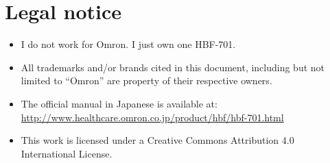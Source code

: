 \documentclass[10pt]{article}
\begin{document}
\section{Legal notice}
\label{sec:legal}
\begin{itemize}
  \item I do not work for Omron. I just own one HBF-701.
  \item All trademarks and/or brands cited in this document, including but not
        limited to ``Omron'' are property of their respective owners.
  \item The official manual in Japanese is available at:
        \url{http://www.healthcare.omron.co.jp/product/hbf/hbf-701.html}
  \item This work is licensed under a Creative Commons Attribution 4.0
        International License.
\end{itemize}
\end{document}
